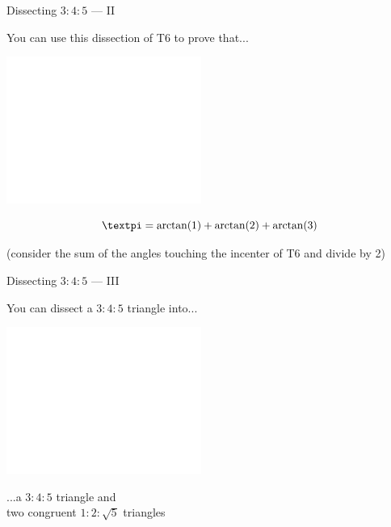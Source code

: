 \documentclass[14pt]{beamer}
\begin{document}

    \begin{frame}{Dissecting $3\!\!:\!\!4\!\!:\!\!5$ --- II}
        \begin{center}
            You can use this dissection of T6 to prove that...

            \bigskip\bigskip

            \includegraphics[height=18ex]{figures/figure006c.pdf}\vspace{-1em}

            $$\text{\textpi} = \arctan{\!\left(1\right)} + \arctan{\!\left(2\right)} + \arctan{\!\left(3\right)}$$

            {\footnotesize(consider the sum of the angles touching the incenter of T6 and divide by 2)}
        \end{center}
    \end{frame}


    \begin{frame}{Dissecting $3\!\!:\!\!4\!\!:\!\!5$ --- III}
        \begin{center}
            You can dissect a $3\!\!:\!\!4\!\!:\!\!5$ triangle into...

            \bigskip \bigskip

            \includegraphics[height=18ex]{figures/figure006d.pdf}

            \bigskip \bigskip

            ...a $3\!\!:\!\!4\!\!:\!\!5$ triangle and\\two congruent $1\!\!:\!\!2\!\!:\!\!\sqrt{5}$ triangles
        \end{center}
    \end{frame}
\end{document}
